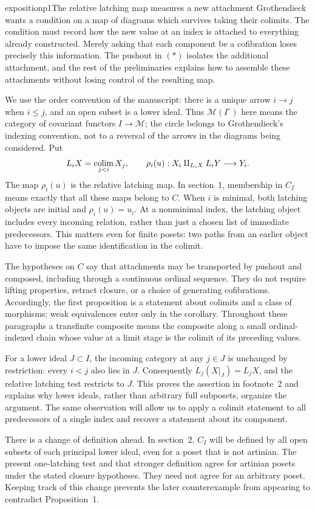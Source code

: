 
\begin{dcomment}{exposition}{p1}{The relative latching map measures a new attachment}
Grothendieck wants a condition on a map of diagrams which survives taking their colimits. The condition must record how the new value at an index is attached to everything already constructed. Merely asking that each component be a cofibration loses precisely this information. The pushout in $(*)$ isolates the additional attachment, and the rest of the preliminaries explains how to assemble these attachments without losing control of the resulting map.

We use the order convention of the manuscript: there is a unique arrow $i\to j$ when $i\leq j$, and an open subset is a lower ideal. Thus $\mathcal M(I^\circ)$ here means the category of covariant functors $I\to\mathcal M$; the circle belongs to Grothendieck's indexing convention, not to a reversal of the arrows in the diagrams being considered. Put
\[
 L_iX=\mathop{\rm colim}_{j<i}X_j,
 \qquad
 \rho_i(u):X_i\amalg_{L_iX}L_iY\longrightarrow Y_i.
\]
The map $\rho_i(u)$ is the relative latching map. In section~1, membership in $C_I$ means exactly that all these maps belong to $C$. When $i$ is minimal, both latching objects are initial and $\rho_i(u)=u_i$. At a nonminimal index, the latching object includes every incoming relation, rather than just a chosen list of immediate predecessors. This matters even for finite posets: two paths from an earlier object have to impose the same identification in the colimit.

The hypotheses on $C$ say that attachments may be transported by pushout and composed, including through a continuous ordinal sequence. They do not require lifting properties, retract closure, or a choice of generating cofibrations. Accordingly, the first proposition is a statement about colimits and a class of morphisms; weak equivalences enter only in the corollary. Throughout these paragraphs a transfinite composite means the composite along a small ordinal-indexed chain whose value at a limit stage is the colimit of its preceding values.

For a lower ideal $J\subset I$, the incoming category at any $j\in J$ is unchanged by restriction: every $i<j$ also lies in $J$. Consequently $L_j(X|_J)=L_jX$, and the relative latching test restricts to $J$. This proves the assertion in footnote~2 and explains why lower ideals, rather than arbitrary full subposets, organize the argument. The same observation will allow us to apply a colimit statement to all predecessors of a single index and recover a statement about its component.

There is a change of definition ahead. In section~2, $C_I$ will be defined by all open subsets of each principal lower ideal, even for a poset that is not artinian. The present one-latching test and that stronger definition agree for artinian posets under the stated closure hypotheses. They need not agree for an arbitrary poset. Keeping track of this change prevents the later counterexample from appearing to contradict Proposition~1.
\end{dcomment}

